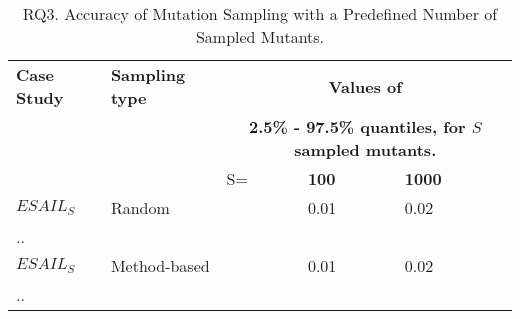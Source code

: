 
\begin{table}[h]
\caption{RQ3. Accuracy of Mutation Sampling with a Predefined Number of Sampled Mutants.}
\label{table:results:fixedNumberOfMutants} 
\tiny
\begin{tabular}{|
p{15mm}p{15mm}
p{1mm}
p{1.5mm}p{1.5mm}
|}
\hline
\textbf{Case Study}&\textbf{Sampling type}&\multicolumn{3}{c|}{\textbf{Values of}}\\
&&\multicolumn{3}{c|}{\textbf{2.5\% - 97.5\% quantiles, for $S$ sampled mutants.}}\\ 
\hline
&&S=&\textbf{100}&\textbf{1000}
\\
$\mathit{ESAIL}_{S}$&Random
&&0.01&0.02
\\
..
\\
$\mathit{ESAIL}_{S}$&Method-based
&&0.01&0.02 
\\
..
\\
\end{tabular}

\end{table}